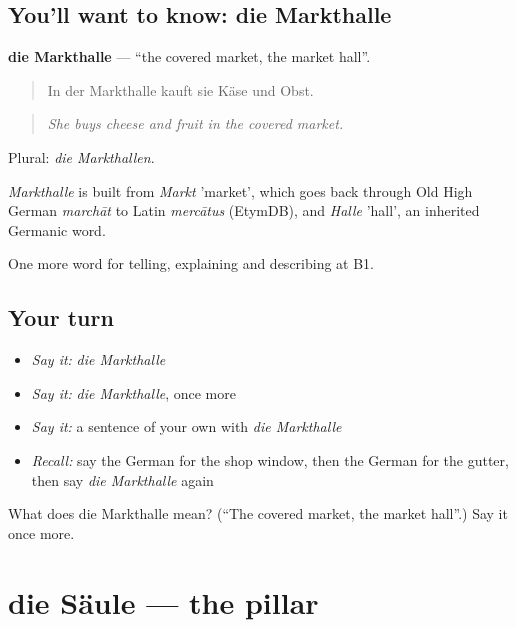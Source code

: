 \subsection*{You'll want to know: die Markthalle}
\textbf{die Markthalle} — \textquotedblleft{}the covered market, the market hall\textquotedblright{}.

\begin{quote}
In der Markthalle kauft sie Käse und Obst.
\end{quote}

\begin{quote}
\emph{She buys cheese and fruit in the covered market.}
\end{quote}

Plural: \emph{die Markthallen}.

\begin{cousinweb}
\emph{Markthalle} is built from \emph{Markt} 'market', which goes back through Old High German \emph{marchāt} to Latin \emph{mercātus} (EtymDB), and \emph{Halle} 'hall', an inherited Germanic word.
\end{cousinweb}

\begin{grammarlens}[title={What you've built}]
One more word for telling, explaining and describing at B1.
\end{grammarlens}

\subsection*{Your turn}
\begin{itemize}
\raggedright
  \item \emph{Say it:} \emph{die Markthalle}
  \item \emph{Say it:} \emph{die Markthalle}, once more
  \item \emph{Say it:} a sentence of your own with \emph{die Markthalle}
  \item \emph{Recall:} say the German for the shop window, then the German for the gutter, then say \emph{die Markthalle} again
\end{itemize}

\begin{tcolorbox}[breakable,colback=teal!4,colframe=teal!35!black,title={Before you move on}]
What does die Markthalle mean? (\textquotedblleft{}The covered market, the market hall\textquotedblright{}.) Say it once more.
\end{tcolorbox}
\section[die Säule]{die Säule — the pillar}

